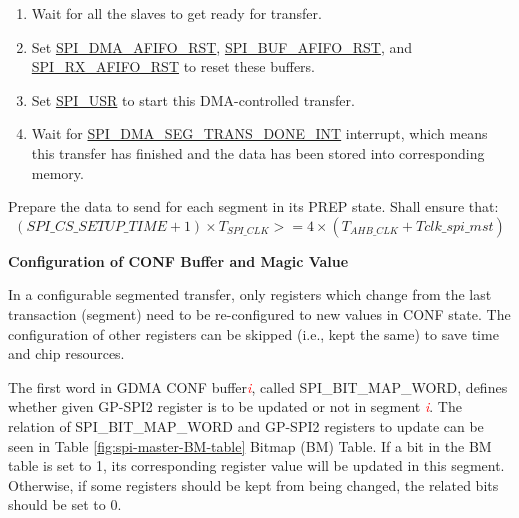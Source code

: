 \documentclass[main\_\_EN.tex]{subfiles}
\begin{document}
\begin{enumerate}
   \item Wait for all the slaves to get ready for transfer.
   
    \item Set \hyperref[fielddesc:SPIDMAAFIFORST]{SPI\_DMA\_AFIFO\_RST}, \hyperref[fielddesc:SPIBUFAFIFORST]{SPI\_BUF\_AFIFO\_RST}, and \hyperref[fielddesc:SPIRXAFIFORST]{SPI\_RX\_AFIFO\_RST} to reset these buffers.
   
   \item Set \hyperref[fielddesc:SPIUSR]{SPI\_USR} to start this DMA-controlled transfer.
   
   \item Wait for \hyperref[int:SPIDMASEGTRANSDONEINT]{SPI\_DMA\_SEG\_TRANS\_DONE\_INT} interrupt, which means this transfer has finished and the data has been stored into corresponding memory.
 \end{enumerate}

\begin{tiplisting}
\vspace{-2em}
Prepare the data to send for each segment in its PREP state. Shall ensure that:
\vspace{1em}
    \[
    (\hyperref[fielddesc:SPICSSETUPTIME]{SPI\_CS\_SETUP\_TIME} + 1) \times T_{SPI\_CLK} >= 4 \times (T_{AHB\_CLK} + Tclk\_spi\_mst)
    \]
\end{tiplisting}

\textbf{Configuration of CONF Buffer and Magic Value}\label{sec:SCT-CONF-Buffer}

In a configurable segmented transfer, only registers which change from the last transaction (segment) need to be re-configured to new values in CONF state. The configuration of other registers can be skipped (i.e., kept the same) to save time and chip resources. 

The first word in GDMA CONF buffer\textcolor{red}{\it i}, called SPI\_BIT\_MAP\_WORD, defines whether given GP-SPI2 register is to be updated or not in segment \textcolor{red}{\it i}. The relation of SPI\_BIT\_MAP\_WORD and GP-SPI2 registers to update can be seen in Table \ref{fig:spi-master-BM-table} Bitmap (BM) Table. If a bit in the BM table is set to 1, its corresponding register value will be updated in this segment. Otherwise, if some registers should be kept from being changed, the related bits should be set to 0.
\end{document}
